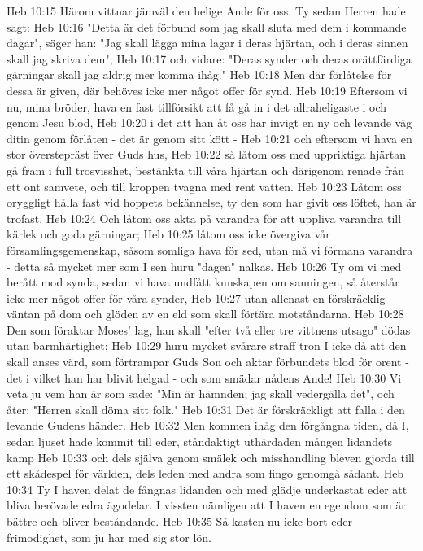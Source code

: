 Heb 10:15  Härom vittnar jämväl den helige Ande för oss. Ty sedan Herren hade sagt:
Heb 10:16  "Detta är det förbund som jag skall sluta med dem i kommande dagar", säger han: "Jag skall lägga mina lagar i deras hjärtan, och i deras sinnen skall jag skriva dem";
Heb 10:17  och vidare: "Deras synder och deras orättfärdiga gärningar skall jag aldrig mer komma ihåg."
Heb 10:18  Men där förlåtelse för dessa är given, där behöves icke mer något offer för synd.
Heb 10:19  Eftersom vi nu, mina bröder, hava en fast tillförsikt att få gå in i det allraheligaste i och genom Jesu blod,
Heb 10:20  i det att han åt oss har invigt en ny och levande väg ditin genom förlåten - det är genom sitt kött -
Heb 10:21  och eftersom vi hava en stor överstepräst över Guds hus,
Heb 10:22  så låtom oss med uppriktiga hjärtan gå fram i full trosvisshet, bestänkta till våra hjärtan och därigenom renade från ett ont samvete, och till kroppen tvagna med rent vatten.
Heb 10:23  Låtom oss oryggligt hålla fast vid hoppets bekännelse, ty den som har givit oss löftet, han är trofast.
Heb 10:24  Och låtom oss akta på varandra för att uppliva varandra till kärlek och goda gärningar;
Heb 10:25  låtom oss icke övergiva vår församlingsgemenskap, såsom somliga hava för sed, utan må vi förmana varandra - detta så mycket mer som I sen huru "dagen" nalkas.
Heb 10:26  Ty om vi med berått mod synda, sedan vi hava undfått kunskapen om sanningen, så återstår icke mer något offer för våra synder,
Heb 10:27  utan allenast en förskräcklig väntan på dom och glöden av en eld som skall förtära motståndarna.
Heb 10:28  Den som föraktar Moses' lag, han skall "efter två eller tre vittnens utsago" dödas utan barmhärtighet;
Heb 10:29  huru mycket svårare straff tron I icke då att den skall anses värd, som förtrampar Guds Son och aktar förbundets blod för orent - det i vilket han har blivit helgad - och som smädar nådens Ande!
Heb 10:30  Vi veta ju vem han är som sade: "Min är hämnden; jag skall vedergälla det", och åter: "Herren skall döma sitt folk."
Heb 10:31  Det är förskräckligt att falla i den levande Gudens händer.
Heb 10:32  Men kommen ihåg den förgångna tiden, då I, sedan ljuset hade kommit till eder, ståndaktigt uthärdaden mången lidandets kamp
Heb 10:33  och dels själva genom smälek och misshandling bleven gjorda till ett skådespel för världen, dels leden med andra som fingo genomgå sådant.
Heb 10:34  Ty I haven delat de fångnas lidanden och med glädje underkastat eder att bliva berövade edra ägodelar. I vissten nämligen att I haven en egendom som är bättre och bliver beståndande.
Heb 10:35  Så kasten nu icke bort eder frimodighet, som ju har med sig stor lön.
